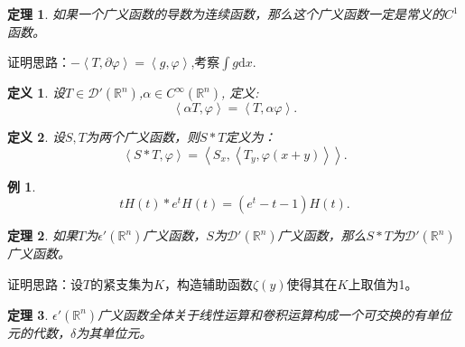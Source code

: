 \documentclass[a4paper]{ctexart}
\newtheorem{Definition}{\hspace{2em}定义}[section]
\newtheorem{Example}{\hspace{2em}例}[section]
\newtheorem{Thm}{\hspace{2em}定理}[section]
\newcommand{\Rn}{\mathbb{R}^{n}}
\newcommand{\dif}{\mathrm{d}}
\newcommand{\innerprod}[2]{\left<#1,#2\right>}
\begin{document}
\begin{Thm}
    如果一个广义函数的导数为连续函数，那么这个广义函数一定是常义的$C^{1}$函数。
\end{Thm}
证明思路：$-\innerprod{T}{\partial\varphi}=\innerprod{g}{\varphi}$,考察$\int g\dif x$.
\begin{Definition}
    设$T\in\mathcal{D}'(\Rn)$,$\alpha\in C^{\infty}(\Rn)$, 定义:
    \begin{equation}
        \innerprod{\alpha T}{\varphi}=\innerprod{T}{\alpha\varphi}.
    \end{equation}
\end{Definition}
\begin{Definition}
    设$S,T$为两个广义函数，则$S*T$定义为：
    \begin{equation}
        \innerprod{S*T}{\varphi}=\innerprod{S_{x}}{\innerprod{T_{y}}{\varphi(x+y)}}.
    \end{equation}
\end{Definition}
\begin{Example}
    \begin{equation}
        tH(t)*e^{t}H(t)=(e^{t}-t-1)H(t).
    \end{equation}
\end{Example}
\begin{Thm}
    如果$T$为$\epsilon'(\Rn)$广义函数，$S$为$\mathcal{D}'(\Rn)$广义函数，那么$S*T$为$\mathcal{D}'(\Rn)$广义函数。
\end{Thm}
证明思路：设$T$的紧支集为$K$，构造辅助函数$\zeta(y)$使得其在$K$上取值为1。
\begin{Thm}
    $\epsilon'(\Rn)$广义函数全体关于线性运算和卷积运算构成一个可交换的有单位元的代数，$\delta$为其单位元。
\end{Thm}
\end{document}
